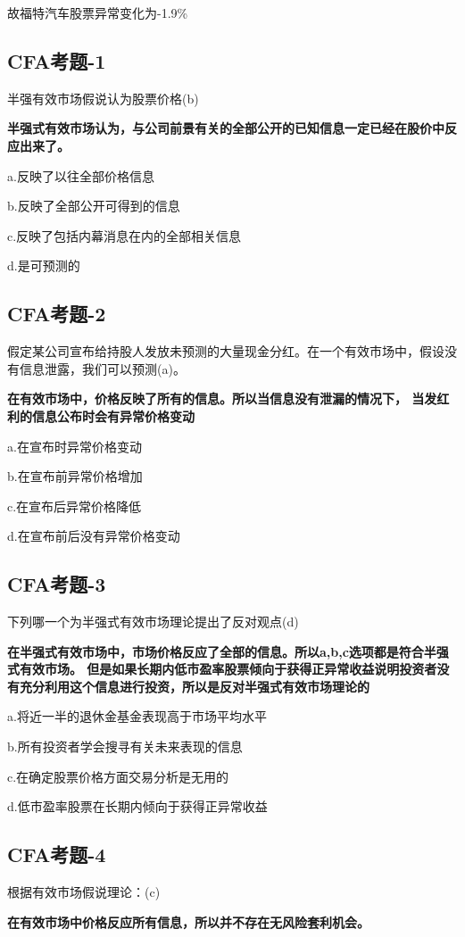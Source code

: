 \documentclass{article}
\begin{document}
故福特汽车股票异常变化为-1.9\%
\subsection*{CFA考题-1}
半强有效市场假说认为股票价格(b)

\textbf{半强式有效市场认为，与公司前景有关的全部公开的已知信息一定已经在股价中反应出来了。}

a.反映了以往全部价格信息

b.反映了全部公开可得到的信息

c.反映了包括内幕消息在内的全部相关信息

d.是可预测的

\subsection*{CFA考题-2}
假定某公司宣布给持股人发放未预测的大量现金分红。在一个有效市场中，假设没有信息泄露，我们可以预测(a)。

\textbf{在有效市场中，价格反映了所有的信息。所以当信息没有泄漏的情况下，
当发红利的信息公布时会有异常价格变动}

a.在宣布时异常价格变动

b.在宣布前异常价格增加

c.在宣布后异常价格降低

d.在宣布前后没有异常价格变动

\subsection*{CFA考题-3}
下列哪一个为半强式有效市场理论提出了反对观点(d)

\textbf{在半强式有效市场中，市场价格反应了全部的信息。所以a,b,c选项都是符合半强式有效市场。
但是如果长期内低市盈率股票倾向于获得正异常收益说明投资者没有充分利用这个信息进行投资，所以是反对半强式有效市场理论的}

a.将近一半的退休金基金表现高于市场平均水平

b.所有投资者学会搜寻有关未来表现的信息

c.在确定股票价格方面交易分析是无用的

d.低市盈率股票在长期内倾向于获得正异常收益

\subsection*{CFA考题-4}
根据有效市场假说理论：(c)

\textbf{在有效市场中价格反应所有信息，所以并不存在无风险套利机会。}
\end{document}
